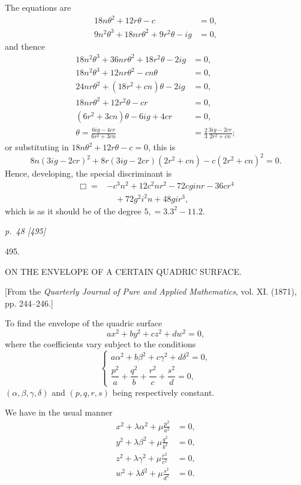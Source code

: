 ﻿\documentclass[11pt,a4paper]{article}
\theoremstyle{plain}
\theoremstyle{definition}
\begin{document}
The equations are
\[
\begin{aligned}
18n\theta^2+12r\theta-c&=0,\\
9n^2\theta^3+18nr\theta^2+9r^2\theta-ig&=0,
\end{aligned}
\]
and thence
\[
\begin{aligned}
18n^2\theta^3+36nr\theta^2+18r^2\theta-2ig&=0,\\
18n^2\theta^3+12nr\theta^2-cn\theta&=0,\\
24nr\theta^2+(18r^2+cn)\theta-2ig&=0,\\
18nr\theta^2+12r^2\theta-cr&=0,\\
(6r^2+3cn)\theta-6ig+4cr&=0,\\
\theta=\frac{6ig-4cr}{6r^2+3cn}
&=\frac{2}{3}\frac{3ig-2cr}{2r^2+cn};
\end{aligned}
\]
or substituting in \(18n\theta^2+12r\theta-c=0\), this is
\[
8n(3ig-2cr)^2+8r(3ig-2cr)(2r^2+cn)-c(2r^2+cn)^2=0.
\]
Hence, developing, the special discriminant is
\[
\begin{aligned}
\Box={}&-c^3n^2+12c^2nr^2-72cginr-36cr^4\\
&\quad+72g^2i^2n+48gir^3,
\end{aligned}
\]
which is as it should be of the degree \(5,=3.3^2-11.2\).

\clearpage
\textit{p.~48 [495]}

\begin{center}
{\Large 495.}

\vspace{1.5em}

{\large ON THE ENVELOPE OF A CERTAIN QUADRIC SURFACE.}

\vspace{1em}

[From the \textit{Quarterly Journal of Pure and Applied Mathematics},
vol. XI. (1871), pp. 244--246.]
\end{center}

To find the envelope of the quadric surface
\[
ax^2+by^2+cz^2+dw^2=0,
\]
where the coefficients vary subject to the conditions
\[
\begin{cases}
a\alpha^2+b\beta^2+c\gamma^2+d\delta^2=0,\\[0.4em]
\dfrac{p^2}{a}+\dfrac{q^2}{b}+\dfrac{r^2}{c}+\dfrac{s^2}{d}=0,
\end{cases}
\]
\((\alpha,\beta,\gamma,\delta)\) and \((p,q,r,s)\) being respectively
constant.

We have in the usual manner
\[
\begin{aligned}
x^2+\lambda\alpha^2+\mu\frac{p^2}{a^2}&=0,\\
y^2+\lambda\beta^2+\mu\frac{q^2}{b^2}&=0,\\
z^2+\lambda\gamma^2+\mu\frac{r^2}{c^2}&=0,\\
w^2+\lambda\delta^2+\mu\frac{s^2}{d^2}&=0.
\end{aligned}
\]
\end{document}
